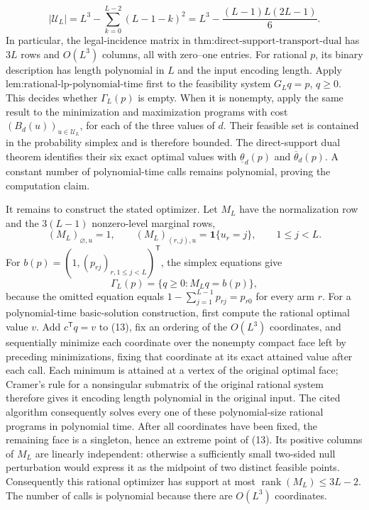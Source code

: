 \[
 |\mathcal U_L|
 =L^3-\sum_{k=0}^{L-2}(L-1-k)^2
 =L^3-\frac{(L-1)L(2L-1)}6.
 \tag{12}
\]
In particular, the legal-incidence matrix in \(\text{thm:direct-support-transport-dual}\) has \(3L\) rows and \(O(L^3)\) columns, all with zero--one entries.  For rational \(p\), its binary description has length polynomial in \(L\) and the input encoding length.  Apply \(\text{lem:rational-lp-polynomial-time}\) first to the feasibility system \(G_Lq=p\), \(q\ge0\).  This decides whether \(\Gamma_L(p)\) is empty.  When it is nonempty, apply the same result to the minimization and maximization programs with cost \((B_d(u))_{u\in\mathcal U_L}\), for each of the three values of \(d\).  Their feasible set is contained in the probability simplex and is therefore bounded.  The direct-support dual theorem identifies their six exact optimal values with \(\underline\theta_d(p)\) and \(\overline\theta_d(p)\).  A constant number of polynomial-time calls remains polynomial, proving the computation claim.

It remains to construct the stated optimizer.  Let \(M_L\) have the normalization row and the \(3(L-1)\) nonzero-level marginal rows,
\[
 (M_L)_{\varnothing,u}=1,
 \qquad
 (M_L)_{(r,j),u}=\mathbf 1\{u_r=j\},
 \qquad 1\le j<L.
\]
For \(b(p)=(1,(p_{rj})_{r,1\le j<L})^{\mathsf T}\), the simplex equations give
\[
 \Gamma_L(p)=\{q\ge0:M_Lq=b(p)\},
 \tag{13}
\]
because the omitted equation equals \(1-\sum_{j=1}^{L-1}p_{rj}=p_{r0}\) for every arm \(r\).  For a polynomial-time basic-solution construction, first compute the rational optimal value \(v\).  Add \(c^{\mathsf T}q=v\) to (13), fix an ordering of the \(O(L^3)\) coordinates, and sequentially minimize each coordinate over the nonempty compact face left by preceding minimizations, fixing that coordinate at its exact attained value after each call.  Each minimum is attained at a vertex of the original optimal face; Cramer's rule for a nonsingular submatrix of the original rational system therefore gives it encoding length polynomial in the original input.  The cited algorithm consequently solves every one of these polynomial-size rational programs in polynomial time.  After all coordinates have been fixed, the remaining face is a singleton, hence an extreme point of (13).  Its positive columns of \(M_L\) are linearly independent: otherwise a sufficiently small two-sided null perturbation would express it as the midpoint of two distinct feasible points.  Consequently this rational optimizer has support at most \(\operatorname{rank}(M_L)\le3L-2\).  The number of calls is polynomial because there are \(O(L^3)\) coordinates.

